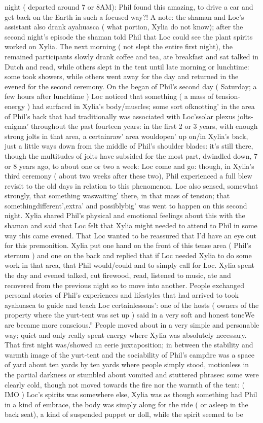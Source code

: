 \documentclass[12pt]{book}
\begin{document}
night ( departed around 7 or 8AM): Phil found this amazing, to drive a car and get back on the Earth in such a focused way?! A note: the shaman and Loc's assistant also drank ayahuasca ( what portion, Xylia do not know); after the second night's episode the shaman told Phil that Loc could see the plant spirits worked on Xylia. The next morning ( not slept the entire first night), the remained participants slowly drank coffee and tea, ate breakfast and sat talked in Dutch and read, while others slept in the tent until late morning or lunchtime: some took showers, while others went away for the day and returned in the evened for the second ceremony. On the began of Phil's second day ( Saturday; a few hours after lunchtime ) Loc noticed that something ( a mass of tension-energy ) had surfaced in Xylia's body/muscles; some sort ofknotting' in the area of Phil's back that had traditionally was associated with Loc'ssolar plexus jolts-enigma' throughout the past fourteen years: in the first 2 or 3 years, with enough strong jolts in that area, a certainraw' area wouldopen' up on/in Xylia's back, just a little ways down from the middle of Phil's shoulder blades: it's still there, though the multitudes of jolts have subsided for the most part, dwindled down, 7 or 8 years ago, to about one or two a week: Loc come and go: though, in Xylia's third ceremony ( about two weeks after these two), Phil experienced a full blew revisit to the old days in relation to this phenomenon. Loc also sensed, somewhat strongly, that something waswaiting' there, in that mass of tension; that somethingdifferent',extra' and possiblybig' was went to happen on this second night. Xylia shared Phil's physical and emotional feelings about this with the shaman and said that Loc felt that Xylia might needed to attend to Phil in some way this came evened. That Loc wanted to be reassured that I'd have an eye out for this premonition. Xylia put one hand on the front of this tense area ( Phil's sternum ) and one on the back and replied that if Loc needed Xylia to do some work in that area, that Phil would/could and to simply call for Loc. Xylia spent the day and evened talked, cut firewood, read, listened to music, ate and recovered from the previous night so to move into another. People exchanged personal stories of Phil's experiences and lifestyles that had arrived to took ayahuasca to guide and teach Loc certainlessons': one of the hosts ( owners of the property where the yurt-tent was set up ) said in a very soft and honest toneWe are became more conscious.'' People moved about in a very simple and personable way; quiet and only really spent energy where Xylia was absolutely necessary. That first night was/showed an eerie juxtaposition; in between the stability and warmth image of the yurt-tent and the sociability of Phil's campfire was a space of yard about ten yards by ten yards where people simply stood, motionless in the partial darkness or stumbled about vomited and stuttered phrases: some were clearly cold, though not moved towards the fire nor the warmth of the tent: ( IMO ) Loc's spirits was somewhere else, Xylia was as though something had Phil in a kind of embrace, the body was simply along for the ride ( or asleep in the back seat), a kind of suspended puppet or doll, while the spirit seemed to be 
\end{document}

